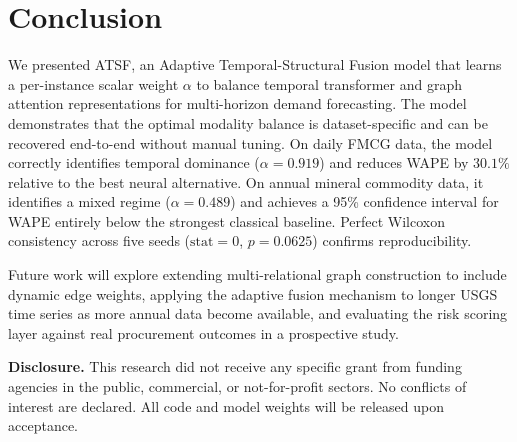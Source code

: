 
\section{Conclusion}
\label{sec:conclusion}

We presented ATSF, an Adaptive Temporal-Structural Fusion model
that learns a per-instance scalar weight $\alpha$ to balance
temporal transformer and graph attention representations for
multi-horizon demand forecasting. The model demonstrates that the
optimal modality balance is dataset-specific and can be recovered
end-to-end without manual tuning. On daily FMCG data, the model
correctly identifies temporal dominance ($\alpha{=}0.919$) and
reduces WAPE by $30.1\%$ relative to the best neural alternative.
On annual mineral commodity data, it identifies a mixed regime
($\alpha{=}0.489$) and achieves a 95\% confidence interval for
WAPE entirely below the strongest classical baseline. Perfect
Wilcoxon consistency across five seeds ($\text{stat}{=}0$,
$p{=}0.0625$) confirms reproducibility.

Future work will explore extending multi-relational graph
construction to include dynamic edge weights, applying the
adaptive fusion mechanism to longer USGS time series as more
annual data become available, and evaluating the risk scoring
layer against real procurement outcomes in a prospective study.

\smallskip
\noindent\textbf{Disclosure.} This research did not receive any
specific grant from funding agencies in the public, commercial,
or not-for-profit sectors. No conflicts of interest are declared.
All code and model weights will be released upon acceptance.
